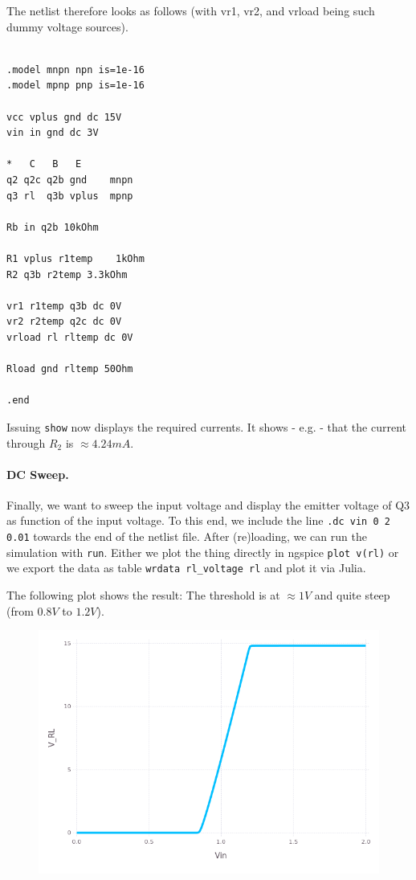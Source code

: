 The netlist therefore looks as follows (with vr1, vr2, and vrload being such dummy voltage sources).

\begin{verbatim}

.model mnpn npn is=1e-16
.model mpnp pnp is=1e-16

vcc vplus gnd dc 15V
vin in gnd dc 3V

*   C   B   E
q2 q2c q2b gnd    mnpn
q3 rl  q3b vplus  mpnp

Rb in q2b 10kOhm

R1 vplus r1temp    1kOhm
R2 q3b r2temp 3.3kOhm

vr1 r1temp q3b dc 0V
vr2 r2temp q2c dc 0V
vrload rl rltemp dc 0V

Rload gnd rltemp 50Ohm

.end

\end{verbatim}

Issuing \verb!show! now displays the required currents. It shows - e.g. - that the current through $R_2$ is $\approx 4.24mA$.


\paragraph{DC Sweep.} Finally, we want to sweep the input voltage and display the emitter voltage of Q3 as function of the input voltage. To this end, we include the line \verb!.dc vin 0 2 0.01! towards the end of the netlist file. After (re)loading, we can run the simulation with \verb!run!. Either we plot the thing directly in ngspice \verb!plot v(rl)! or we export the data as table \verb!wrdata rl_voltage rl! and plot it via Julia.

The following plot shows the result: The threshold is at $\approx 1V$ and quite steep (from $0.8V$ to $1.2V$).

\begin{figure}[htb]
\includegraphics[scale=0.5]{images/rl_voltage.png}
\end{figure}




